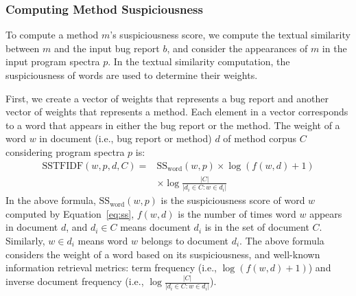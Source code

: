 
\subsubsection{Computing Method Suspiciousness}
To compute a method $m$'s suspiciousness score, we compute the textual similarity between $m$ and the input bug report $b$, and consider the appearances of $m$ in the input program spectra $p$. In the textual similarity computation, the suspiciousness of words are used to determine their weights.

First, we create a vector of weights that represents a bug report and another vector of weights that represents a method. Each element in a vector corresponds to a word that appears in either the bug report or the method. The weight of a word $w$ in document (i.e., bug report or method) $d$ of method corpus $C$ considering program spectra $p$ is:
\begin{align*}
\text{SSTFIDF}(w,p,d,C)=&\text{SS}_{\text{word}}(w,p)\times \log(f(w,d)+1)\\
&\times \log\frac{|C|}{|{d_i\in C : w \in d_i }|}
\end{align*}
In the above formula, $\text{SS}_\text{word}(w,p)$ is the suspiciousness score of word $w$ computed by Equation~\ref{eq:ss}, $f(w,d)$ is the number of times word $w$ appears in document $d$, and $d_i \in C$ means document $d_i$ is in the set of document $C$. Similarly, $w \in d_i$ means word $w$ belongs to document $d_i$. The above formula considers the weight of a word based on its suspiciousness, and well-known information retrieval metrics: term frequency (i.e., $\log(f(w,d)+1)$) and inverse document frequency (i.e., $\log\frac{|C|}{|{d_i\in C : w \in d_i }|}$).

